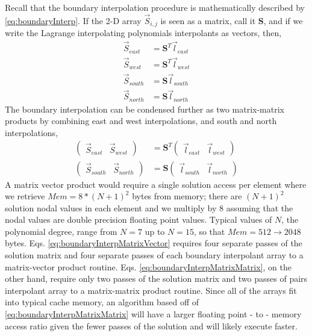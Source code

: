 \documentclass{softwaremanual}
\begin{document}
 Recall that the boundary interpolation procedure is mathematically described by \eqref{eq:boundaryInterp}. If the 2-D array $\vec{S}_{i,j}$ is seen as a matrix, call it $\boldsymbol{S}$, and if we write the Lagrange interpolating polynomials interpolants as vectors, then,
\begin{subequations}
\begin{align}
\vec{S}_{east} &= \boldsymbol{S}^T \vec{l}_{east} \\
\vec{S}_{west} &= \boldsymbol{S}^T \vec{l}_{west} \\
\vec{S}_{south} &= \boldsymbol{S} \vec{l}_{south} \\
\vec{S}_{north} &= \boldsymbol{S} \vec{l}_{north} \label{eq:boundaryInterpMatrixVector}
\end{align}
\end{subequations} 
The boundary interpolation can be condensed further as two matrix-matrix products by combining east and west interpolations, and south and north interpolations,
\begin{subequations}
\begin{align}
   \begin{pmatrix} \vec{S}_{east} & \vec{S}_{west} \end{pmatrix} &= \boldsymbol{S}^T \begin{pmatrix} \vec{l}_{east} & \vec{l}_{west} \end{pmatrix}\\
\begin{pmatrix} \vec{S}_{south} & \vec{S}_{north} \end{pmatrix} &= \boldsymbol{S} \begin{pmatrix} \vec{l}_{south} & \vec{l}_{north} \end{pmatrix}  \label{eq:boundaryInterpMatrixMatrix}
\end{align} 
\end{subequations}
A matrix vector product would require a single solution access per element where we retrieve $Mem = 8*(N+1)^2$ bytes from memory; there are $(N+1)^2$ solution nodal values in each element and we multiply by $8$ assuming that the nodal values are double precision floating point values. Typical values of $N$, the polynomial degree, range from $N=7$ up to $N=15$, so that $Mem = 512\rightarrow 2048$ bytes. Eqs. \eqref{eq:boundaryInterpMatrixVector} requires four separate passes of the solution matrix  and four separate passes of each boundary interpolant array to a matrix-vector product routine. Eqs. \eqref{eq:boundaryInterpMatrixMatrix}, on the other hand, require only two passes of the solution matrix and two passes of pairs interpolant array to a matrix-matrix product routine. Since all of the arrays fit into typical cache memory, an algorithm based off of \eqref{eq:boundaryInterpMatrixMatrix} will have a larger floating point - to - memory access ratio given the fewer passes of the solution and will likely execute faster.
\end{document}
